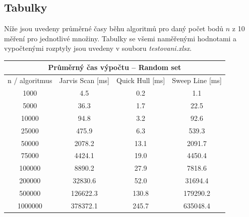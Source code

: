 \documentclass[a4paper, 12pt]{article}
\begin{document}
\subsection{Tabulky}
Níže jsou uvedeny průměrné časy běhu algoritmů pro daný počet bodů $n$ z 10 měření pro jednotlivé množiny. Tabulky se všemi naměřenými hodnotami a vypočtenými rozptyly jsou uvedeny v souboru \textit{testovani.xlsx}. 

\begin{table}[]
\centering
\begin{tabular}{|c|c|c|c|}
\hline
\multicolumn{4}{|c|}{\textbf{Průměrný čas výpočtu – Random set}}                  \\ \hline
n / algoritmus & Jarvis Scan {[}ms{]} & Quick Hull {[}ms{]} & Sweep Line {[}ms{]} \\ \hline
1000           & 4.5                  & 0.2                 & 1.1                 \\ \hline
5000           & 36.3                 & 1.7                 & 22.5                \\ \hline
10000          & 94.8                 & 3.2                 & 92.6                \\ \hline
25000          & 475.9                & 6.3                 & 539.3               \\ \hline
50000          & 2078.2               & 13.1                & 2091.7              \\ \hline
75000          & 4424.1               & 19.0                & 4450.4              \\ \hline
100000         & 8890.2               & 27.9                & 7818.6              \\ \hline
200000         & 32830.6              & 52.0                & 31694.4             \\ \hline
500000         & 126622.3             & 130.8               & 179290.2            \\ \hline
1000000        & 378372.1             & 245.7               & 635048.4            \\ \hline
\end{tabular}
\end{table}
\end{document}
